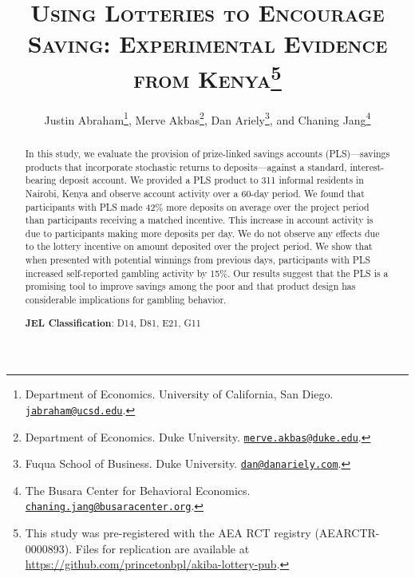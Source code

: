 \documentclass[11pt]{article}
\begin{document}
\title{\textsc{Using Lotteries to Encourage Saving: Experimental Evidence from Kenya}\protect\footnote{This study was pre-registered with the AEA RCT registry (AEARCTR-0000893). Files for replication are available at \url{https://github.com/princetonbpl/akiba-lottery-pub}.}}

	\author{Justin Abraham\thanks{Department of Economics. University of California, San Diego. \protect\href{mailto:jabraham@ucsd.edu}{\nolinkurl{jabraham@ucsd.edu}}.}, Merve Akbas\thanks{Department of Economics. Duke University. \protect\href{mailto:merve.akbas@duke.edu}{\nolinkurl{merve.akbas@duke.edu}}.}, Dan Ariely\thanks{Fuqua School of Business. Duke University. \protect\href{mailto:dan@danariely.com}{\nolinkurl{dan@danariely.com}}.}, and Chaning Jang\thanks{The Busara Center for Behavioral Economics. \protect\href{mailto:chaning.jang@busaracenter.org}{\nolinkurl{chaning.jang@busaracenter.org}}.}} %

	\maketitle

	\begin{abstract}

		In this study, we evaluate the provision of prize-linked savings accounts (PLS)---savings products that incorporate stochastic returns to deposits---against a standard, interest-bearing deposit account. We provided a PLS product to 311 informal residents in Nairobi, Kenya and observe account activity over a 60-day period. We found that participants with PLS made 42\% more deposits on average over the project period than participants receiving a matched incentive. This increase in account activity is due to participants making more deposits per day. We do not observe any effects due to the lottery incentive on amount deposited over the project period. We show that when presented with potential winnings from previous days, participants with PLS increased self-reported gambling activity by 15\%. Our results suggest that the PLS is a promising tool to improve savings among the poor and that product design has considerable implications for gambling behavior.


		\medskip \noindent
		\textbf{JEL Classification}: D14, D81, E21, G11

	\end{abstract}
\end{document}
